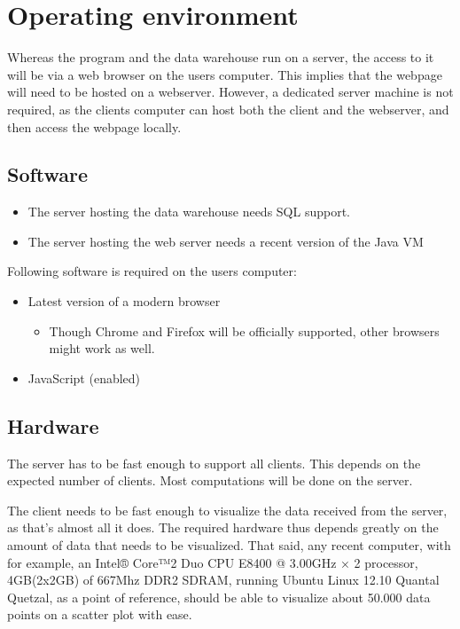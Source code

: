 \section{Operating environment}



Whereas the program and the \gls{data warehouse} run on a server,
the access to it will be via a web browser on the users computer. 
This implies that the webpage will need to be hosted on a webserver.
However, a dedicated server machine is not required, as the clients computer can 
host both the client and the webserver, and then access the webpage locally.



\subsection{Software}
\begin{itemize}
  \item The server hosting the \gls{data warehouse} needs \gls{SQL} support. 
  
  \item The server hosting the web server needs a 
  recent version of the \gls{Java VM}
\end{itemize}


Following software is required on the users computer:
\begin{itemize}
  \item Latest version of a modern browser
  \begin{itemize}
    \item Though Chrome and Firefox will be officially supported, other browsers might work as well.
  \end{itemize}
  \item JavaScript (enabled)
\end{itemize}



\subsection{Hardware}

The server has to be fast enough to support all clients. This depends on
the expected number of clients. Most computations will be done on the server.

The client needs to be fast enough to visualize the data received from the server, as that's almost all it does.
The required hardware thus depends greatly on the amount of data that needs to be 
visualized. That said, any recent computer, with for example, 
an Intel® Core™2 Duo CPU E8400 @ 3.00GHz × 2 processor, 
4GB(2x2GB) of 667Mhz DDR2 SDRAM, running Ubuntu Linux 12.10 Quantal Quetzal, 
as a point of reference, should be able to visualize about 50.000 
data points on a \gls{scatter plot} with ease.


